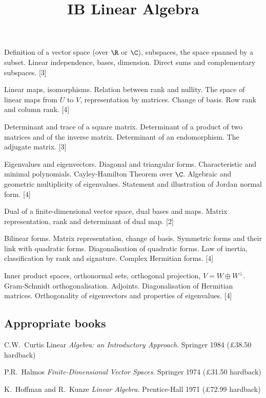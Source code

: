 \documentclass[twoside]{scrartcl}
\title{IB Linear Algebra}
\begin{document}
{
{\Large\bfseries{}}

Deﬁnition of a vector space (over $\R$ or $\C$), subspaces, the space spanned by a subset. Linear independence, bases, dimension. Direct sums and complementary subspaces. \hfill [3]

Linear maps, isomorphisms. Relation between rank and nullity. The space of linear maps from $U$ to $V$, representation by matrices. Change of basis. Row rank and column rank. \hfill [4]

Determinant and trace of a square matrix. Determinant of a product of two matrices and of the inverse matrix. Determinant of an endomorphism. The adjugate matrix. \hfill  [3]

Eigenvalues and eigenvectors. Diagonal and triangular forms. Characteristic and minimal polynomials. Cayley-Hamilton Theorem over $\C$. Algebraic and geometric multiplicity of eigenvalues. Statement and illustration of Jordan normal form. \hfill  [4]

Dual of a ﬁnite-dimensional vector space, dual bases and maps. Matrix representation, rank and determinant of dual map. \hfill  [2]

Bilinear forms. Matrix representation, change of basis. Symmetric forms and their link with quadratic forms. Diagonalisation of quadratic forms. Law of inertia, classification by rank and signature. Complex Hermitian forms. \hfill  [4]

Inner product spaces, orthonormal sets, orthogonal projection, $V=W\oplus W^\perp$. Gram-Schmidt orthogonalisation. Adjoints. Diagonalisation of Hermitian matrices. Orthogonality of eigenvectors and properties of eigenvalues. \hfill  [4]

\subsection*{Appropriate books}

{\shortskip
C.W.~Curtis Linear \emph{Algebra: an Introductory Approach}. Springer 1984 (£38.50 hardback)

P.R.~Halmos \emph{Finite-Dimensional Vector Spaces}. Springer 1974 (£31.50 hardback)

K.~Hoffman and R.~Kunze \emph{Linear Algebra}. Prentice-Hall 1971 (£72.99 hardback)}}

\TableofContents

\end{document}
